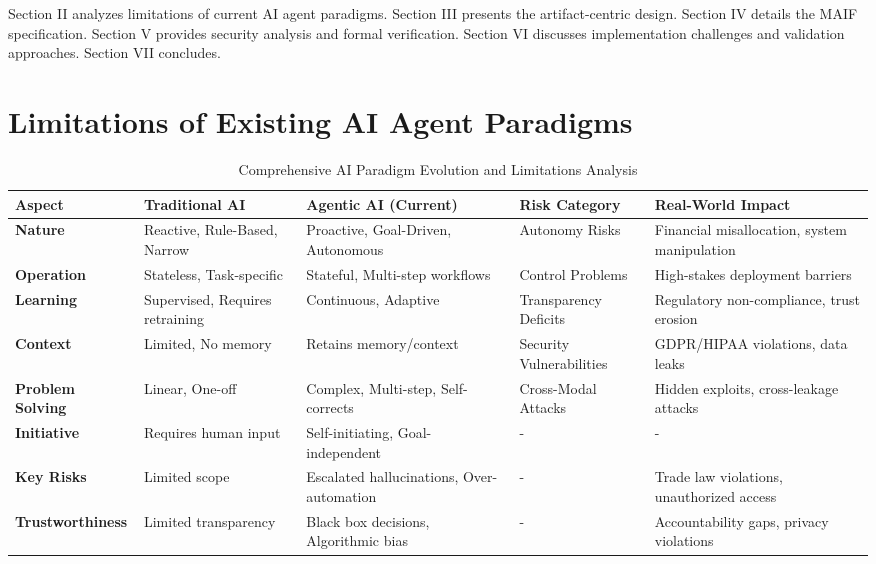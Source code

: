 \documentclass[conference]{IEEEtran}
\begin{document}
Section II analyzes limitations of current AI agent paradigms. Section III presents the artifact-centric design. Section IV details the MAIF specification. Section V provides security analysis and formal verification. Section VI discusses implementation challenges and validation approaches. Section VII concludes.

\section{Limitations of Existing AI Agent Paradigms}
\label{sec:limitations}

\begin{table*}[!t]
\renewcommand{\arraystretch}{1.3}
\caption{Comprehensive AI Paradigm Evolution and Limitations Analysis}
\label{tab:ai-paradigm-analysis}
\centering
\footnotesize
\begin{tabular}{p{2.5cm}p{3.5cm}p{3.5cm}p{3cm}p{3.5cm}}
\toprule
\textbf{Aspect} & \textbf{Traditional AI} & \textbf{Agentic AI (Current)} & \textbf{Risk Category} & \textbf{Real-World Impact} \\
\midrule
\textbf{Nature} & Reactive, Rule-Based, Narrow & Proactive, Goal-Driven, Autonomous & Autonomy Risks & Financial misallocation, system manipulation \\
\textbf{Operation} & Stateless, Task-specific & Stateful, Multi-step workflows & Control Problems & High-stakes deployment barriers \\
\textbf{Learning} & Supervised, Requires retraining & Continuous, Adaptive & Transparency Deficits & Regulatory non-compliance, trust erosion \\
\textbf{Context} & Limited, No memory & Retains memory/context & Security Vulnerabilities & GDPR/HIPAA violations, data leaks \\
\textbf{Problem Solving} & Linear, One-off & Complex, Multi-step, Self-corrects & Cross-Modal Attacks & Hidden exploits, cross-leakage attacks \\
\textbf{Initiative} & Requires human input & Self-initiating, Goal-independent & - & - \\
\textbf{Key Risks} & Limited scope & Escalated hallucinations, Over-automation & - & Trade law violations, unauthorized access \\
\textbf{Trustworthiness} & Limited transparency & Black box decisions, Algorithmic bias & - & Accountability gaps, privacy violations \\
\bottomrule
\end{tabular}
\end{table*}
\end{document}
